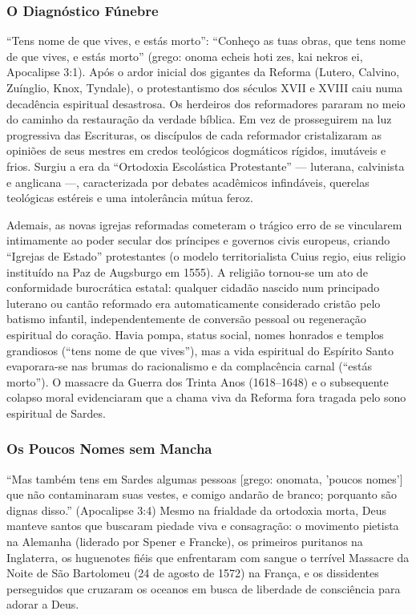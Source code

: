 \subsubsection*{O Diagnóstico Fúnebre}
``Tens nome de que vives, e estás morto'':
``Conheço as tuas obras, que tens nome de que vives, e estás morto'' (grego: onoma echeis hoti zes, kai nekros ei, Apocalipse 3:1).
Após o ardor inicial dos gigantes da Reforma (Lutero, Calvino, Zuínglio, Knox, Tyndale), o protestantismo dos séculos XVII e XVIII caiu numa decadência espiritual desastrosa. Os herdeiros dos reformadores pararam no meio do caminho da restauração da verdade bíblica. Em vez de prosseguirem na luz progressiva das Escrituras, os discípulos de cada reformador cristalizaram as opiniões de seus mestres em credos teológicos dogmáticos rígidos, imutáveis e frios. Surgiu a era da ``Ortodoxia Escolástica Protestante'' — luterana, calvinista e anglicana —, caracterizada por debates acadêmicos infindáveis, querelas teológicas estéreis e uma intolerância mútua feroz.

Ademais, as novas igrejas reformadas cometeram o trágico erro de se vincularem intimamente ao poder secular dos príncipes e governos civis europeus, criando ``Igrejas de Estado'' protestantes (o modelo territorialista Cuius regio, eius religio instituído na Paz de Augsburgo em 1555). A religião tornou-se um ato de conformidade burocrática estatal: qualquer cidadão nascido num principado luterano ou cantão reformado era automaticamente considerado cristão pelo batismo infantil, independentemente de conversão pessoal ou regeneração espiritual do coração. Havia pompa, status social, nomes honrados e templos grandiosos (``tens nome de que vives''), mas a vida espiritual do Espírito Santo evaporara-se nas brumas do racionalismo e da complacência carnal (``estás morto''). O massacre da Guerra dos Trinta Anos (1618–1648) e o subsequente colapso moral evidenciaram que a chama viva da Reforma fora tragada pelo sono espiritual de Sardes.


\subsubsection*{Os Poucos Nomes sem Mancha}
``Mas também tens em Sardes algumas pessoas [grego: onomata, 'poucos nomes'] que não contaminaram suas vestes, e comigo andarão de branco; porquanto são dignas disso.'' (Apocalipse 3:4)
Mesmo na frialdade da ortodoxia morta, Deus manteve santos que buscaram piedade viva e consagração: o movimento pietista na Alemanha (liderado por Spener e Francke), os primeiros puritanos na Inglaterra, os huguenotes fiéis que enfrentaram com sangue o terrível Massacre da Noite de São Bartolomeu (24 de agosto de 1572) na França, e os dissidentes perseguidos que cruzaram os oceanos em busca de liberdade de consciência para adorar a Deus.


